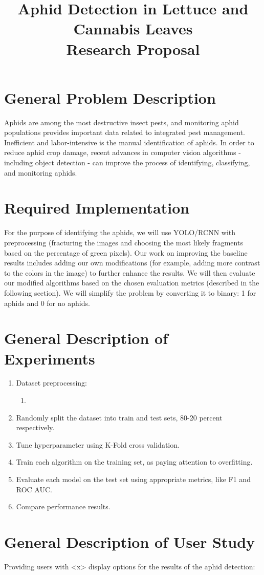 \documentclass{article}
\title{Aphid Detection in Lettuce and Cannabis Leaves \\ Research Proposal}
\begin{document}
\maketitle

\section*{General Problem Description}
Aphids are among the most destructive insect pests, and monitoring aphid populations provides important data related to integrated pest management. Inefficient and labor-intensive is the manual identification of aphids. In order to reduce aphid crop damage, recent advances in computer vision algorithms - including object detection - can improve the process of identifying, classifying, and monitoring aphids.

\section*{Required Implementation}
For the purpose of identifying the aphids, we will use YOLO/RCNN with preprocessing (fracturing the images and choosing the most likely fragments based on the percentage of green pixels). Our work on improving the baseline results includes adding our own modifications (for example, adding more contrast to the colors in the image) to further enhance the results. We will then evaluate our modified algorithms based on the chosen evaluation metrics (described in the following section). We will simplify the problem by converting it to binary: 1 for aphids and 0 for no aphids.

\section*{General Description of Experiments}
\begin{enumerate}
  \item Dataset preprocessing:
  \begin{enumerate}
    \item <fill here when the data will be published> 
  \end{enumerate}
  \item Randomly split the dataset into train and test sets, 80-20 percent respectively.
  \item Tune hyperparameter using K-Fold cross validation.
  \item Train each algorithm on the training set, as paying attention to overfitting.
  \item Evaluate each model on the test set using appropriate metrics, like F1 and ROC AUC.
  \item Compare performance results.
\end{enumerate}

\section*{General Description of User Study}
Providing users with <x> display options for the results of the aphid detection:
\end{document}
